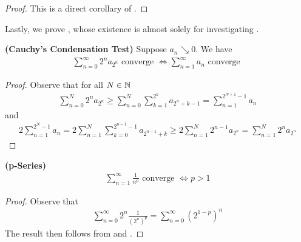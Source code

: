 \documentclass{report}
\begin{document}
\begin{proof}
This is a direct corollary of .  
\end{proof}
\begin{mdframed}
Lastly, we prove , whose existence is almost solely for investigating .
\end{mdframed}
\begin{theorem}
\label{Cauchy's Condensation Test}
\textbf{(Cauchy's Condensation Test)} Suppose $a_n\searrow 0$. We have 
\begin{align*}
\sum_{n=0}^{\infty} 2^na_{2^n}\text{ converge }\iff \sum_{n=1}^{\infty}a_n\text{ converge }
\end{align*}
\end{theorem}
\begin{proof}
Observe that for all $N\in\mathbb{N}$ 
\begin{align*}
\sum_{n=0}^N 2^n a_{2^n}\geq \sum_{n=0}^N \sum_{k=1}^{2^n} a_{2^n+k-1} =\sum_{n=1}^{2^{N+1}-1}a_n
\end{align*}
and
\begin{align*}
 2\sum_{n=1}^{2^N-1} a_n= 2\sum_{n=1}^N \sum_{k=0}^{2^{n-1}-1}a_{2^{n-1}+k}\geq 2\sum_{n=1}^N 2^{n-1} a_{2^n}=\sum_{n=1}^N 2^na_{2^n}
\end{align*}
\end{proof}
\begin{theorem}
\label{p-Series}
\textbf{(p-Series)}
\begin{align*}
\sum_{n=1}^{\infty} \frac{1}{n^p}\text{ converge }\iff p>1
\end{align*}
\end{theorem}
\begin{proof}
Observe that
\begin{align*}
\sum_{n=0}^{\infty} 2^n \frac{1}{(2^n)^p}=\sum_{n=0}^{\infty}(2^{1-p})^n
\end{align*}
The result then follows from   and . 
\end{proof}
\end{document}
